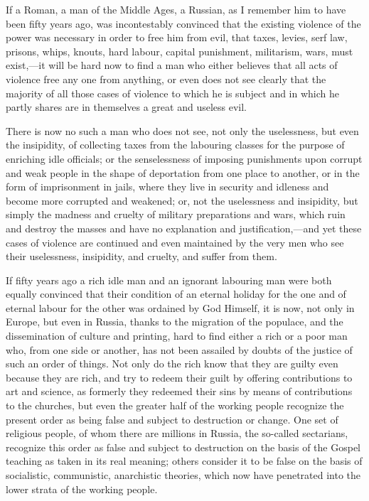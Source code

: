\documentclass{book}
\begin{document}
If a Roman, a man of the Middle Ages, a Russian, as I remember him to have been fifty years ago, was incontestably convinced that the existing violence of the power was necessary in order to free him from evil, that taxes, levies, serf law, prisons, whips, knouts, hard labour, capital punishment, militarism, wars, must exist,—it will be hard now to find a man who either believes that all acts of violence free any one from anything, or even does not see clearly that the majority of all those cases of violence to which he is subject and in which he partly shares are in themselves a great and useless evil.

There is now no such a man who does not see, not only the uselessness, but even the insipidity, of collecting taxes from the labouring classes for the purpose of enriching idle officials; or the senselessness of imposing punishments upon corrupt and weak people in the shape of deportation from one place to another, or in the form of imprisonment in jails, where they live in security and idleness and become more corrupted and weakened; or, not the uselessness and insipidity, but simply the madness and cruelty of military preparations and wars, which ruin and destroy the masses and have no explanation and justification,—and yet these cases of violence are continued and even maintained by the very men who see their uselessness, insipidity, and cruelty, and suffer from them.

If fifty years ago a rich idle man and an ignorant labouring man were both equally convinced that their condition of an eternal holiday for the one and of eternal labour for the other was ordained by God Himself, it is now, not only in Europe, but even in Russia, thanks to the migration of the populace, and the dissemination of culture and printing, hard to find either a rich or a poor man who, from one side or another, has not been assailed by doubts of the justice of such an order of things. Not only do the rich know that they are guilty even because they are rich, and try to redeem their guilt by offering contributions to art and science, as formerly they redeemed their sins by means of contributions to the churches, but even the greater half of the working people recognize the present order as being false and subject to destruction or change. One set of religious people, of whom there are millions in Russia, the so-called sectarians, recognize this order as false and subject to destruction on the basis of the Gospel teaching as taken in its real meaning; others consider it to be false on the basis of socialistic, communistic, anarchistic theories, which now have penetrated into the lower strata of the working people.
\end{document}
